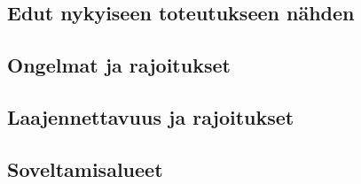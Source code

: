 

\subsection{Edut nykyiseen toteutukseen nähden}


\subsection{Ongelmat ja rajoitukset}


\subsection{Laajennettavuus ja rajoitukset}


\subsection{Soveltamisalueet}
